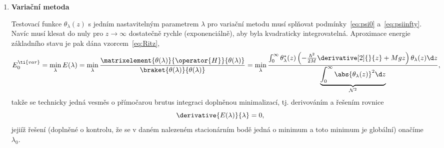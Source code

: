 \begin{solution}
\begin{enumerate}
\begin{itemize}
                    \begin{figure}[!htbp]
                        \begin{subfigure}{0.49\linewidth}
                            \centering{}
                        \end{subfigure}
                        \hfill
                        \begin{subfigure}{0.49\linewidth}
                            \centering{}
                        \end{subfigure}
                        \label{fig:hopik}
                    \end{figure}
            \end{itemize}

        \item \textbf{Variační metoda}

            Testovací funkce $\theta_{\lambda}(z)$ s jedním nastavitelným parametrem $\lambda$ pro variační metodu musí splňovat podmínky~\eqref{eq:psi0} a~\eqref{eq:psiinfty}.
            Navíc musí klesat do nuly pro $z\rightarrow\infty$ dostatečně rychle (exponenciálně), aby byla kvadraticky integrovatelná.
            Aproximace energie základního stavu je pak dána vzorcem~\eqref{eq:Ritz},
            \begin{equation}
                E_{0}^{\ti{var}}
                    =\min_{\lambda}E(\lambda)
                    =\min_{\lambda}\frac{\matrixelement{\theta(\lambda)}{\operator{H}}{\theta(\lambda)}}{\braket{\theta(\lambda)}{\theta(\lambda)}}
                    =\min_{\lambda}\frac{\int_{0}^{\infty}\theta_{\lambda}^{*}(z)\left(-\frac{\hbar^{2}}{2M}\derivative[2]{}{z}+Mgz\right)\theta_{\lambda}(z)\d z}
                    {\underbrace{\int_{0}^{\infty}\abs{\theta_{\lambda}(z)}^{2}\d z}_{\mathcal{N}^{2}}},
            \end{equation}
            takže se technicky jedná vesměs o přímočarou brutus integraci doplněnou minimalizací, tj. derivováním a řešením rovnice
            \begin{equation}
                \derivative{E(\lambda)}{\lambda}=0,
            \end{equation}
            jejiíž řešení (doplněné o kontrolu, že se v daném nalezeném stacionárním bodě jedná o minimum a toto minimum je globální) onačíme $\lambda_{0}$.


\end{enumerate}
\end{solution}

